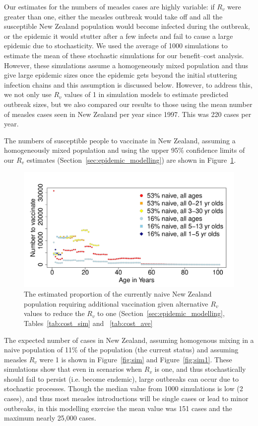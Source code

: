 \documentclass{article}
\begin{document}
Our estimates for the numbers of measles cases are highly variable: if $R_v$ were greater than one, either the measles outbreak would take off and all the susceptible New Zealand population would become infected during the outbreak, or the epidemic it would stutter after a few infects and fail to cause a large epidemic due to stochasticity. We used the average of 1000 simulations to estimate the mean of these stochastic simulations for our benefit--cost analysis. However, these simulations assume a homogeneously mixed population and thus give large epidemic sizes once the epidemic gets beyond the initial stuttering infection chains and this assumption is discussed below. However, to address this, we not only use $R_v$ values of 1 in simulation models to estimate predicted outbreak sizes, but we also compared our results to those using the mean number of measles cases seen in New Zealand per year since 1997. This was 220 cases per year.

The numbers of susceptible people to vaccinate in New Zealand, assuming a homogeneously mixed population and using the upper 95\% confidence limits of our $R_v$ estimates (Section~\ref{sec:epidemic_modelling}) are shown in Figure~\ref{fig:numvac}.


\begin{figure}
     \centering
\includegraphics{draftfinalreport-053}
     \caption{The estimated proportion of the currently naive New Zealand population requiring additional vaccination given alternative $R_v$ values to reduce the $R_v$ to one (Section~\ref{sec:epidemic_modelling}, Tables~\ref{tab:cost_sim} and ~\ref{tab:cost_ave}}
     \label{fig:numvac}
\end{figure}

The expected number of cases in New Zealand, assuming homogenous mixing in a naive population of 11\% of the population (the current status) and assuming measles $R_v$ were 1 is shown in Figure~\ref{fig:sim} and Figure~\ref{fig:sim1}. These simulations show that even in scenarios when $R_v$ is one, and thus stochastically should fail to persist (i.e. become endemic), large outbreaks can occur due to stochastic processes. Though the median value from 1000 simulations is low (2 cases), and thus most measles introductions will be single cases or lead to minor outbreaks, in this modelling exercise the mean value was 151 cases and the maximum nearly 25,000 cases.
\end{document}
